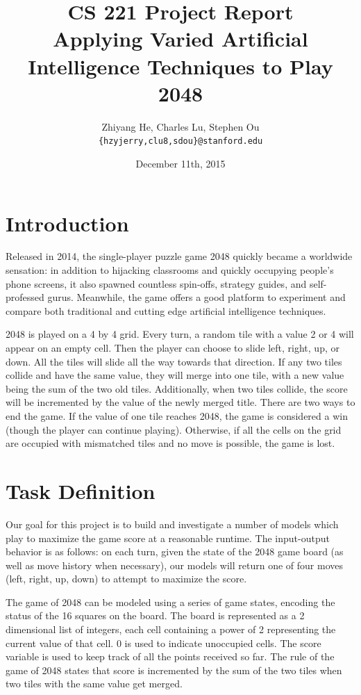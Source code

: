\documentclass[9pt,twocolumn]{article}
\title{CS 221 Project Report \\ Applying Varied Artificial Intelligence Techniques to Play 2048}
\author{Zhiyang He, Charles Lu, Stephen Ou \\ \texttt{\{hzyjerry,clu8,sdou\}@stanford.edu}}
\date{December 11th, 2015}
\begin{document}
\maketitle

\section{Introduction}

Released in 2014, the single-player puzzle game 2048 quickly became a worldwide sensation: in addition to hijacking classrooms and quickly occupying people's phone screens, it also spawned countless spin-offs, strategy guides, and self-professed gurus. Meanwhile, the game offers a good platform to experiment and compare both traditional and cutting edge artificial intelligence techniques.

2048 is played on a 4 by 4 grid. Every turn, a random tile with a value 2 or 4 will appear on an empty cell. Then the player can choose to slide left, right, up, or down. All the tiles will slide all the way towards that direction. If any two tiles collide and have the same value, they will merge into one tile, with a new value being the sum of the two old tiles. Additionally, when two tiles collide, the score will be incremented by the value of the newly merged title. There are two ways to end the game. If the value of one tile reaches 2048, the game is considered a win (though the player can continue playing). Otherwise, if all the cells on the grid are occupied with mismatched tiles and no move is possible, the game is lost.

\section{Task Definition}

Our goal for this project is to build and investigate a number of models which play to maximize the game score at a reasonable runtime. The input-output behavior is as follows: on each turn, given the state of the 2048 game board (as well as move history when necessary), our models will return one of four moves (left, right, up, down) to attempt to maximize the score.

The game of 2048 can be modeled using a series of game states, encoding the status of the 16 squares on the board. The board is represented as a 2 dimensional list of integers, each cell containing a power of 2 representing the current value of that cell. 0 is used to indicate unoccupied cells. The score variable is used to keep track of all the points received so far. The rule of the game of 2048 states that score is incremented by the sum of the two tiles when two tiles with the same value get merged.
\end{document}
